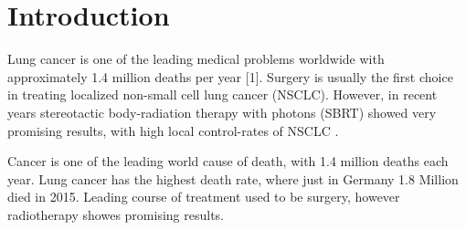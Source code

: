 \documentclass[11pt,twoside,a4paper]{article}
\begin{document}
\section{Introduction}


Lung cancer is one of the leading medical problems worldwide with approximately 1.4 million deaths per year [1]. 
Surgery is usually the first choice in treating localized non-small cell lung cancer (NSCLC). However, in recent 
years stereotactic body-radiation therapy with photons (SBRT) showed very promising results, with high local control-rates of NSCLC \cite{ref1174}.

Cancer is one of the leading world cause of death, with 1.4 million deaths each year. Lung cancer has the highest death rate, where just in Germany 1.8 Million died in 2015.
Leading course of treatment used to be surgery, however radiotherapy showes promising results.






\end{document}

